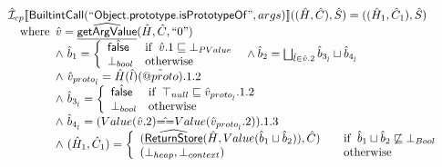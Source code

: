 \documentclass{article}
\makeatletter
\newcommand{\SF}[1]{\mbox{\textsf{#1}}}
\newcommand{\wherec}[1]{{\rm where}\begin{array}[t]{l}#1\end{array}}
\newcommand{\ifc}[1]{{\rm if}\begin{array}[t]{l}#1\end{array}}
\newcommand{\owc}{{\rm otherwise}}
\newcommand{\aI}{\hat{\mathcal{I}}}
\newcommand{\lbr}{\llbracket}
\newcommand{\rbr}{\rrbracket}
\newcommand{\ahf}[1]{\widehat{\underline{\sf #1}}}
\newcommand{\avarprop}[1]{\hat{@#1}}
\newcommand{\afalse}{\hat{\SF{false}}}
\makeatother
\begin{document}
\[\begin{array}{l}
\aI _{cp}\lbr \SF{BuiltintCall}(``\SF{Object.prototype.isPrototypeOf}",args)\rbr((\hat{H},\hat{C}), \hat{S})
  = ((\hat{H}_1, \hat{C}_1), \hat{S})\\
\quad\wherec{
  \hat{v} = \ahf{getArgValue}(\hat{H}, \hat{C}, ``0")\\
  \land\ \hat{b}_1 = \left\{\begin{array}{ll}
      \afalse & \ifc{\hat{v}.1 \sqsubseteq \bot_{PValue}}\\
      \bot_{bool} & \owc
    \end{array}\right.
  \land \hat{b}_2 = \bigsqcup_{\hat{l} \in \hat{v}.2} \hat{b}_{3_{\hat{l}}} \sqcup \hat{b}_{4_{\hat{l}}}\\
  \land\ \hat{v}_{proto_{\hat{l}}} = \hat{H}(\hat{l})(\avarprop{proto}).1.2\\
  \land\ \hat{b}_{3_{\hat{l}}} = \left\{\begin{array}{ll}
      \afalse & \ifc{\top_{null} \sqsubseteq \hat{v}_{proto_{\hat{l}}}.1.2}\\
      \bot_{bool} & \owc
    \end{array}\right.\\
  \land\ \hat{b}_{4_{\hat{l}}} = (Value(\hat{v}.2) \hat{==} Value(\hat{v}_{proto_{\hat{l}}}.2)).1.3\\
  \land\ (\hat{H}_1, \hat{C}_1) = 
    \left\{\begin{array}{l@{\quad\quad}l}
      (\ahf{ReturnStore}(\hat{H}, Value(\hat{b}_1 \sqcup \hat{b}_2)), \hat{C})
      & \ifc{\hat{b}_1 \sqcup \hat{b}_2 \not\sqsubseteq \bot_{Bool}}\\
      (\bot_{heap}, \bot_{context}) & \owc \\
    \end{array}\right.\\
  }\\
\\\\ 
\end{array}
\]
\end{document}
